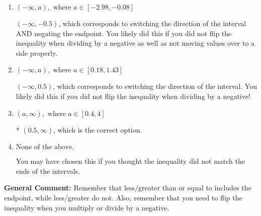 \documentclass{extbook}[14pt]
\begin{document}
\begin{enumerate}
{\begin{enumerate}[label=\Alph*.]
 $(-0.5, \infty)$, which corresponds to negating the endpoint of the solution.
\item \( (-\infty, a), \text{ where } a \in [-2.98, -0.08] \)

 $(-\infty, -0.5)$, which corresponds to switching the direction of the interval AND negating the endpoint. You likely did this if you did not flip the inequality when dividing by a negative as well as not moving values over to a side properly.
\item \( (-\infty, a), \text{ where } a \in [0.18, 1.43] \)

 $(-\infty, 0.5)$, which corresponds to switching the direction of the interval. You likely did this if you did not flip the inequality when dividing by a negative!
\item \( (a, \infty), \text{ where } a \in [0.4, 4] \)

* $(0.5, \infty)$, which is the correct option.
\item \( \text{None of the above}. \)

You may have chosen this if you thought the inequality did not match the ends of the intervals.
\end{enumerate}

\textbf{General Comment:} Remember that less/greater than or equal to includes the endpoint, while less/greater do not. Also, remember that you need to flip the inequality when you multiply or divide by a negative.
}
\end{enumerate}
\end{document}
